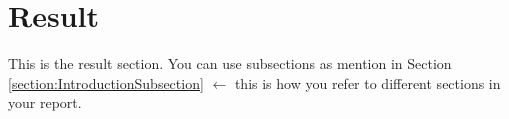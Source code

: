 \documentclass[../main.tex]{subfiles}
\begin{document}
\section{Result}
\justify
This is the result section. You can use subsections as mention in Section \ref{section:IntroductionSubsection} $\leftarrow$ this is how you refer to different sections in your report.
\end{document}
